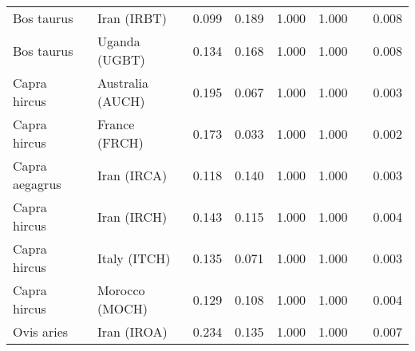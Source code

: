 \begin{center}
\begin{adjustbox}{width = 1\textwidth}
\begin{tabular}{|l|l|r|r|r|r|r|}
          Bos taurus &                     Iran (IRBT) &                                              0.099 &                                              0.189 &                1.000 &                                  1.000~~ &              0.008 \\
          Bos taurus &                   Uganda (UGBT) &                                              0.134 &                                              0.168 &                1.000 &                                  1.000~~ &              0.008 \\
        Capra hircus &                Australia (AUCH) &                                              0.195 &                                              0.067 &                1.000 &                                  1.000~~ &              0.003 \\
        Capra hircus &                   France (FRCH) &                                              0.173 &                                              0.033 &                1.000 &                                  1.000~~ &              0.002 \\
      Capra aegagrus &                     Iran (IRCA) &                                              0.118 &                                              0.140 &                1.000 &                                  1.000~~ &              0.003 \\
        Capra hircus &                     Iran (IRCH) &                                              0.143 &                                              0.115 &                1.000 &                                  1.000~~ &              0.004 \\
        Capra hircus &                    Italy (ITCH) &                                              0.135 &                                              0.071 &                1.000 &                                  1.000~~ &              0.003 \\
        Capra hircus &                  Morocco (MOCH) &                                              0.129 &                                              0.108 &                1.000 &                                  1.000~~ &              0.004 \\
          Ovis aries &                     Iran (IROA) &                                              0.234 &                                              0.135 &                1.000 &                                  1.000~~ &              0.007 \\

\end{tabular}
\end{adjustbox}
\end{center}
